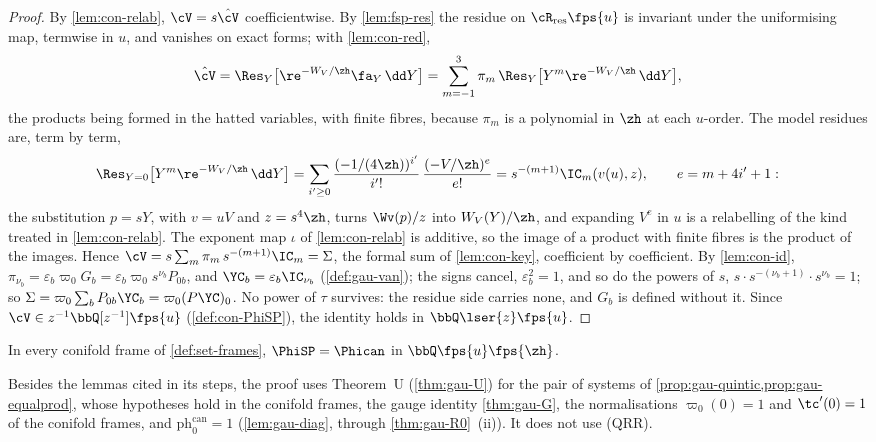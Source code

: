 \begin{proof}
By \cref{lem:con-relab}, $\cV=s\hat\cV$ coefficientwise. By \cref{lem:fsp-res} the residue on $\cR_{\mathrm{res}}\fps{u}$ is invariant under the uniformising map, termwise in $u$, and vanishes on exact forms; with \cref{lem:con-red},
\[
\hat\cV=\Res_Y\bigl[\re^{-W_V/\zh}\fa_Y\,\dd Y\bigr]=\sum_{m=-1}^3\pi_m\,\Res_Y\bigl[Y^m\re^{-W_V/\zh}\,\dd Y\bigr],
\]
the products being formed in the hatted variables, with finite fibres, because $\pi_m$ is a polynomial in $\zh$ at each $u$-order. The model residues are, term by term,
\[
\Res_{Y=0}\bigl[Y^m\re^{-W_V/\zh}\,\dd Y\bigr]=\sum_{i'\geq0}\frac{(-1/(4\zh))^{i'}}{i'!}\,\frac{(-V/\zh)^e}{e!}=s^{-(m+1)}\IC_m(v(u),z),\qquad e=m+4i'+1:
\]
the substitution $p=sY$, with $v=uV$ and $z=s^4\zh$, turns $\Wv(p)/z$ into $W_V(Y)/\zh$, and expanding $V^e$ in $u$ is a relabelling of the kind treated in \cref{lem:con-relab}. The exponent map $\iota$ of \cref{lem:con-relab} is additive, so the image of a product with finite fibres is the product of the images. Hence $\cV=s\sum_m\pi_m\,s^{-(m+1)}\IC_m=\Sigma$, the formal sum of \cref{lem:con-key}, coefficient by coefficient. By \cref{lem:con-id}, $\pi_{\nu_b}=\varepsilon_b\varpi_0G_b=\varepsilon_b\varpi_0s^{\nu_b}P_{0b}$, and $\YC_b=\varepsilon_b\IC_{\nu_b}$ (\cref{def:gau-van}); the signs cancel, $\varepsilon_b^2=1$, and so do the powers of $s$, $s\cdot s^{-(\nu_b+1)}\cdot s^{\nu_b}=1$; so $\Sigma=\varpi_0\sum_bP_{0b}\YC_b=\varpi_0(P\YC)_0$. No power of $\tau$ survives: the residue side carries none, and $G_b$ is defined without it. Since $\cV\in z^{-1}\bbQ[z^{-1}]\fps{u}$ (\cref{def:con-PhiSP}), the identity holds in $\bbQ\lser{z}\fps{u}$.
\end{proof}

\begin{thm}[Theorem P(b)]
\label{thm:con-Pb}
In every conifold frame of \cref{def:set-frames}, $\PhiSP=\Phican$ in $\bbQ\fps{u}\fps{\zh}$.
\end{thm}

Besides the lemmas cited in its steps, the proof uses Theorem~U (\cref{thm:gau-U}) for the pair of systems of \cref{prop:gau-quintic,prop:gau-equalprod}, whose hypotheses hold in the conifold frames, the gauge identity \cref{thm:gau-G}, the normalisations $\varpi_0(0)=1$ and $\tc'(0)=1$ of the conifold frames, and $\mathrm{ph}^{\mathrm{can}}_0=1$ (\cref{lem:gau-diag}, through \cref{thm:gau-R0}~(ii)). It does not use (QRR).

